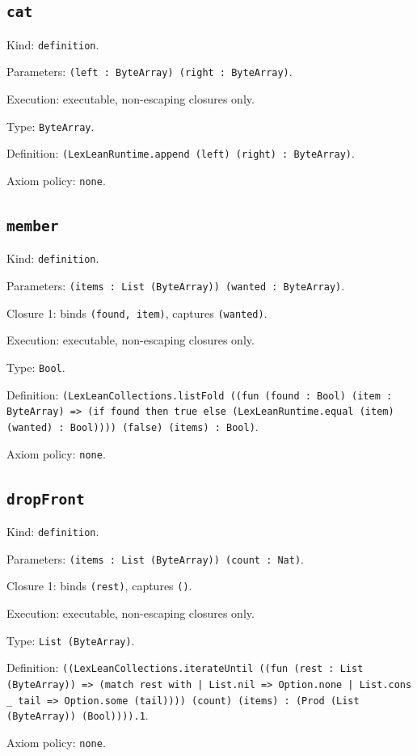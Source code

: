 \documentclass[11pt]{article}
\begin{document}
\subsection*{\texttt{cat}}
\noindent Kind: \texttt{definition}.\par
\noindent Parameters: \texttt{(left : ByteArray) (right : ByteArray)}.\par
\noindent Execution: executable, non-escaping closures only.\par
\noindent Type: \texttt{ByteArray}.\par
\noindent Definition: \texttt{(LexLeanRuntime.append (left) (right) : ByteArray)}.\par
\noindent Axiom policy: \texttt{none}.\par
\subsection*{\texttt{member}}
\noindent Kind: \texttt{definition}.\par
\noindent Parameters: \texttt{(items : List (ByteArray)) (wanted : ByteArray)}.\par
\noindent Closure 1: binds \texttt{(found, item)}, captures \texttt{(wanted)}.\par
\noindent Execution: executable, non-escaping closures only.\par
\noindent Type: \texttt{Bool}.\par
\noindent Definition: \texttt{(LexLeanCollections.listFold ((fun (found : Bool) (item : ByteArray) => (if found then true else (LexLeanRuntime.equal (item) (wanted) : Bool)))) (false) (items) : Bool)}.\par
\noindent Axiom policy: \texttt{none}.\par
\subsection*{\texttt{dropFront}}
\noindent Kind: \texttt{definition}.\par
\noindent Parameters: \texttt{(items : List (ByteArray)) (count : Nat)}.\par
\noindent Closure 1: binds \texttt{(rest)}, captures \texttt{()}.\par
\noindent Execution: executable, non-escaping closures only.\par
\noindent Type: \texttt{List (ByteArray)}.\par
\noindent Definition: \texttt{((LexLeanCollections.iterateUntil ((fun (rest : List (ByteArray)) => (match rest with | List.nil => Option.none | List.cons \_ tail => Option.some (tail)))) (count) (items) : (Prod (List (ByteArray)) (Bool)))).1}.\par
\noindent Axiom policy: \texttt{none}.\par
\end{document}
